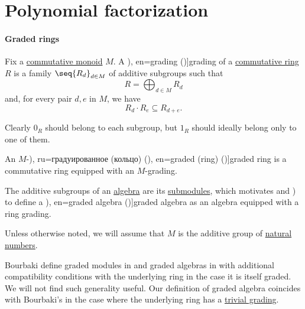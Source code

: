 \section{Polynomial factorization}\label{sec:polynomial_factorization}

\paragraph{Graded rings}

\begin{definition}\label{def:graded_ring}
  Fix a \hyperref[def:monoid/commutative]{commutative monoid} \( M \). A \term[ru=градуировка (\cite[197]{Винберг2014КурсАлгебры}), en=grading (\cite[527]{Aluffi2009Algebra})]{grading} of a \hyperref[def:ring/commutative]{commutative ring} \( R \) is a family \( \seq{ R_d }_{d \in M} \) of additive subgroups such that
  \begin{equation*}
    R = \bigoplus_{d \in M} R_d
  \end{equation*}
  and, for every pair \( d, e \) in \( M \), we have
  \begin{equation}\label{eq:def:graded_ring}
    R_d \cdot R_e \subseteq R_{d + e}.
  \end{equation}

  Clearly \( 0_R \) should belong to each subgroup, but \( 1_R \) should ideally belong only to one of them.

  An \( M \)-\term[bg=градуиран (пръстен) (\cite[56]{КоцевСидеров2016КомутативнаАлгебра}), ru=градуированное (кольцо) (\cite[63]{Шафаревич2019ОсновныеПонятияАлгебры}), en=graded (ring) (\cite[29]{Eisenbud1995CommutativeAlgebra})]{graded ring} is a commutative ring equipped with an \( M \)-grading.

  The additive subgroups of an \hyperref[def:algebra_over_ring]{algebra} are its \hyperref[def:module/subobject]{submodules}, which motivates \textcite[exerc. B-5.2]{Rotman2015AdvancedModernAlgebraPart1} and \textcite[197]{Винберг2014КурсАлгебры}) to define a \term[ru=градуированная (алгебра) (\cite[197]{Винберг2014КурсАлгебры}), en=graded algebra (\cite[exerc. B-5.2]{Rotman2015AdvancedModernAlgebraPart1})]{graded algebra} as an algebra equipped with a ring grading.

  Unless otherwise noted, we will assume that \( M \) is the additive group of \hyperref[def:natural_numbers]{natural numbers}.
\end{definition}
\begin{comments}
  \item Bourbaki define graded modules in \cite[def. II.11.3]{Bourbaki1998Algebra1to3} and graded algebras in \cite[def. III.3.1]{Bourbaki1998Algebra1to3} with additional compatibility conditions with the underlying ring in the case it is itself graded. We will not find such generality useful. Our definition of graded algebra coincides with Bourbaki's in the case where the underlying ring has a \hyperref[def:trivial_ring_grading]{trivial grading}.
\end{comments}

